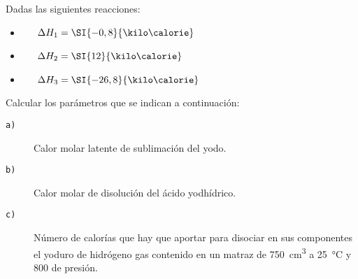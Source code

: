 Dadas las siguientes reacciones:
\begin{itemize}
    \item {}~~~$\Delta H_1 = \SI{-0,8}{\kilo\calorie}$
    \item {}~~~$\Delta H_2 = \SI{12}{\kilo\calorie}$
    \item {}~~~$\Delta H_3 = \SI{-26,8}{\kilo\calorie}$
\end{itemize}
Calcular los parámetros que se indican a continuación:
\begin{description}%
    \item[\texttt{a)}] Calor molar latente de sublimación del yodo.
    \item[\texttt{b)}] Calor molar de disolución del ácido yodhídrico.
    \item[\texttt{c)}] Número de calorías que hay que aportar para disociar en sus componentes el yoduro de hidrógeno gas contenido en un matraz de \SI{750}{\cubic\centi\meter} a \SI{25}{\celsius} y \SI{800}{\torr} de presión.
\end{description}
